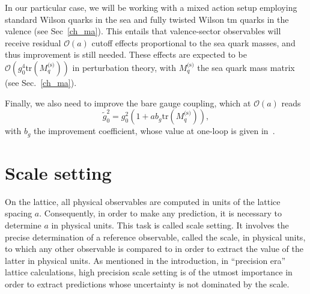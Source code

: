 In our particular case, we will be working with a mixed action setup employing standard Wilson quarks in the sea and fully twisted Wilson tm quarks in the valence (see Sec~\ref{ch_ma}). This entails that valence-sector observables will receive residual $\mathcal{O}(a)$ cutoff effects proportional to the sea quark masses, and thus improvement is still needed. These effects are expected to be $\mathcal{O}\left(g_0^4{\textrm{tr}}\left(M_q^{\textrm{(s)}}\right)\right)$ in perturbation theory, with $M_q^{\textrm{(s)}}$ the sea quark mass matrix (see Sec.~\ref{ch_ma}).

Finally, we also need to improve the bare gauge coupling, which at $\mathcal{O}(a)$ reads
\begin{equation}
\tilde{g}_0^2=g_0^2\left(1+ab_g{\textrm{tr}}\left(M_q^{\textrm{(s)}}\right)\right),
\end{equation}
with $b_g$ the improvement coefficient, whose value at one-loop is given in~\citep{Luscher:1996sc}.


\section{Scale setting}
\label{ch_foundation:sec:ss}

On the lattice, all physical observables are computed in units of the lattice spacing $a$. Consequently, in order to make any prediction, it is necessary to determine $a$ in physical units. This task is called scale setting. It involves the precise determination of a reference observable, called the scale, in physical units, to which any other observable is compared to in order to extract the value of the latter in physical units. As mentioned in the introduction, in ``precision era'' lattice calculations, high precision scale setting is of the utmost importance in order to extract predictions whose uncertainty is not dominated by the scale. 

